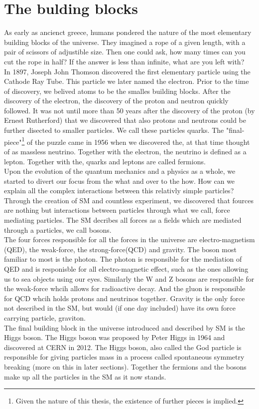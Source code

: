 \section{The bulding blocks}
As early as ancienct greece, humans pondered the nature of the most elementary building blocks of
the universe. They imagined a rope of a given length, with a pair of scissors of adjustible size.
Then one could ask, how many times can you cut the rope in half? If the answer is less than infinite,
what are you left with?
\\
In 1897, Joseph John Thomson discovered the first elementary particle using the Cathode Ray Tube. 
This particle we later named the electron. Prior to the time of discovery, we belived atoms to 
be the smalles building blocks. After the discovery of the electron, the discovery of the 
proton and neutron quickly followed. It was not until more than 50 years after the discovery of 
the proton (by Ernest Rutherford) that we discovered that also protons and neutrons could be further
disected to smaller particles. We call these particles quarks. The "final-piece"\footnote{Given the
nature of this thesis, the existence of further pieces is implied.} of the puzzle came
in 1956 when we discovered the, at that time thought of as massless neutrino. Together
with the electron, the neutrino is defined as a lepton. Together with the, quarks and leptons
are called fermions.
\\
Upon the evolution of the quantum mechanics and a physics as a whole, we started to divert
our focus from the what and over to the how. How can we explain all the complex interactions
between this relativly simple particles? Through the creation of \ac{SM} and countless 
experiment, we discovered that fources are nothing but interactions between particles
through what we call, force mediating particles. The \ac{SM} decribes all forces as a fields which 
are mediated through a particles, we call bosons. 
\\
The four forces responsible for all the forces in the universe are electro-magnetism (\ac{QED}), the weak-force, the strong-force(\ac{QCD})
and gravity. The boson most familiar to most is the photon. The photon is responsible for the mediation 
of \ac{QED} and is responisble for all electro-magnetic effect, such as the ones allowing
us to sea objects using our eyes. Similarly the W and Z bosons are responsible for the weak-force whcih
allows for radioactive decay. And the gluon is responsible for \ac{QCD} whcih holds protons and 
neutrinos together. Gravity is the only force not described in the SM, but would (if one day included)
have its own force carrying particle, graviton. 
\\
The final building block in the universe introduced and described by \ac{SM} is the Higgs boson.
The Higgs boson was proposed by Peter Higgs in 1964 and discovered at CERN in 2012. The Higgs boson,
also called the God particle is responsible for giving particles mass in a process called
spontaneous symmetry breaking (more on this in later sections). Together the fermions and the bosons
make up all the particles in the \ac{SM} as it now stands.
